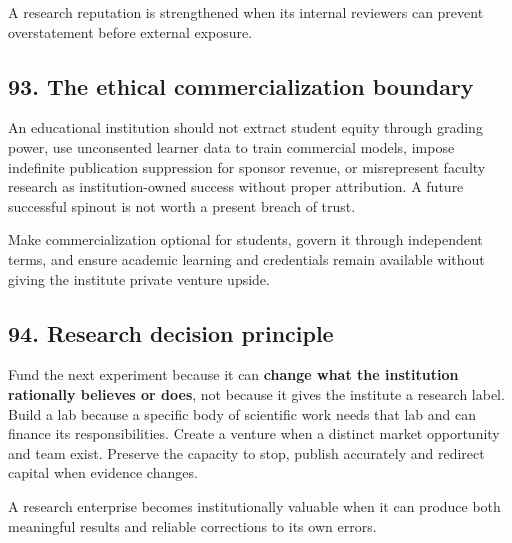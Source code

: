A research reputation is strengthened when its internal reviewers can prevent overstatement before external exposure.

\subsection{93. The ethical commercialization boundary}

An educational institution should not extract student equity through grading power, use unconsented learner data to train commercial models, impose indefinite publication suppression for sponsor revenue, or misrepresent faculty research as institution-owned success without proper attribution. A future successful spinout is not worth a present breach of trust.

Make commercialization optional for students, govern it through independent terms, and ensure academic learning and credentials remain available without giving the institute private venture upside.

\subsection{94. Research decision principle}

Fund the next experiment because it can \textbf{change what the institution rationally believes or does}, not because it gives the institute a research label. Build a lab because a specific body of scientific work needs that lab and can finance its responsibilities. Create a venture when a distinct market opportunity and team exist. Preserve the capacity to stop, publish accurately and redirect capital when evidence changes.

A research enterprise becomes institutionally valuable when it can produce both meaningful results and reliable corrections to its own errors.
